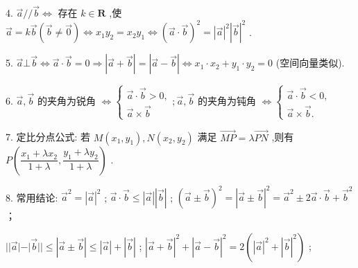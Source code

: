 4. $\overrightarrow{a}//\overrightarrow{b} \Leftrightarrow$ 存在 $k \in  \mathbf{R}$ ,使 $\overrightarrow{a} = k\overrightarrow{b}\left( {\overrightarrow{b} \neq  \overrightarrow{0}}\right)  \Leftrightarrow  {x}_{1}{y}_{2} = {x}_{2}{y}_{1} \Leftrightarrow  {\left( \overrightarrow{a} \cdot  \overrightarrow{b}\right) }^{2} = {\left| \overrightarrow{a}\right| }^{2}{\left| \overrightarrow{b}\right| }^{2}$ .

5. $\overrightarrow{a} \bot  \overrightarrow{b} \Leftrightarrow  \overrightarrow{a} \cdot  \overrightarrow{b} = 0 \Rightarrow  \left| {\overrightarrow{a} + \overrightarrow{b}}\right|  = \left| {\overrightarrow{a} - \overrightarrow{b}}\right|  \Leftrightarrow  {x}_{1} \cdot  {x}_{2} + {y}_{1} \cdot  {y}_{2} = 0$ (空间向量类似).

6. $\overrightarrow{a},\overrightarrow{b}$ 的夹角为锐角 $\Leftrightarrow  \left\{  {\begin{array}{l} \overrightarrow{a} \cdot  \overrightarrow{b} > 0, \\  \overrightarrow{a} \times  \overrightarrow{b} \end{array};\overrightarrow{a},\overrightarrow{b}}\right.$ 的夹角为钝角 $\Leftrightarrow  \left\{  \begin{array}{l} \overrightarrow{a} \cdot  \overrightarrow{b} < 0, \\  \overrightarrow{a} \times  \overrightarrow{b}. \end{array}\right.$

7. 定比分点公式: 若 $M\left( {{x}_{1},{y}_{1}}\right) ,N\left( {{x}_{2},{y}_{2}}\right)$ 满足 $\overrightarrow{MP} = \lambda \overrightarrow{PN}$ ,则有 $P\left( {\dfrac{{x}_{1} + \lambda {x}_{2}}{1 + \lambda },\dfrac{{y}_{1} + \lambda {y}_{2}}{1 + \lambda }}\right)$ .

8. 常用结论:   ${\overset{ \rightarrow  }{a}}^{2} = {\left| \overset{ \rightarrow  }{a}\right| }^{2}$ ;    $\overset{ \rightarrow  }{a} \cdot  \overrightarrow{b} \leq  \left| \overset{ \rightarrow  }{a}\right| \left| \overset{ \rightarrow  }{b}\right|$ ;    ${\left( \overrightarrow{a} \pm  \overrightarrow{b}\right) }^{2} = {\left| \overrightarrow{a} \pm  \overrightarrow{b}\right| }^{2} = {\overrightarrow{a}}^{2} \pm  2\overrightarrow{a} \cdot  \overrightarrow{b} + {\overrightarrow{b}}^{2}$ ；

   $\left| \right| \overrightarrow{a}\left| -\right| \overrightarrow{b}\left| \right|  \leq  \left| {\overrightarrow{a} \pm  \overrightarrow{b}}\right|  \leq  \left| \overrightarrow{a}\right|  + \left| \overrightarrow{b}\right|$ ;    ${\left| \overrightarrow{a} + \overrightarrow{b}\right| }^{2} + {\left| \overrightarrow{a} - \overrightarrow{b}\right| }^{2} = 2\left( {{\left| \overrightarrow{a}\right| }^{2} + {\left| \overrightarrow{b}\right| }^{2}}\right)$ ;

